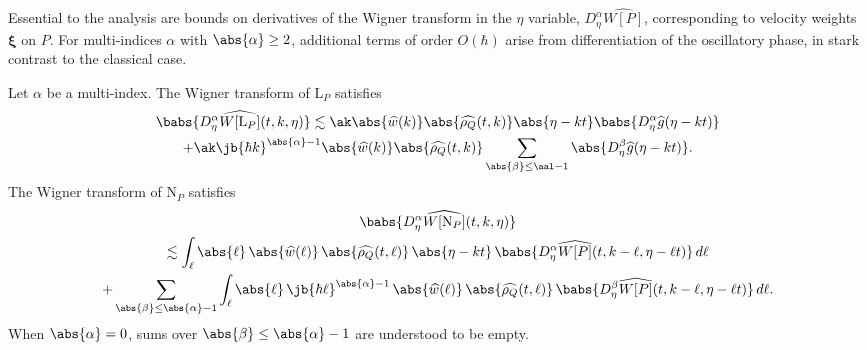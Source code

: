 Essential to the analysis are bounds on derivatives of the Wigner transform in the \( \eta \) variable, \( D^\alpha_\eta\widehat{W[P]} \), corresponding to velocity weights \( \bm{\xi} \) on \( P \). For multi-indices $\alpha$ with $\abs{\alpha}\geq2$, additional terms of order \( O(\hbar) \) arise from differentiation of the oscillatory phase, in stark contrast to the classical case.
\begin{lemma}\label{etalemma}
Let $\alpha$ be a multi-index. The Wigner transform of ${\mathrm{L}_P}$ satisfies\vspace*{-5pt}
\begin{multline*}
\babs{D^\alpha_\eta\widehat{W[{\mathrm{L}_P}]}(t,k,\eta)}\lesssim \ak\abs{\widehat w(k)}\abs{\widehat{\rho_Q}(t,k)}\abs{\eta-kt}\babs{D^\alpha_\eta\widehat g(\eta-kt)}\\
+\ak\jb{\hbar k}^{\abs{\alpha}-1}\abs{\widehat w(k)}\abs{\widehat{\rho_Q}(t,k)}\sum_{\abs{\beta}\leq \aal-1}\abs{D^\beta_\eta\widehat g(\eta-kt)}.
\end{multline*}
The Wigner transform of ${\mathrm{N}_P}$ satisfies\vspace*{-5pt}
\begin{multline*}
\babs{D^\alpha_\eta\widehat{W[{\mathrm{N}_P}]}(t,k,\eta)}\\
\lesssim\int_\ell \abs{\ell }\,\abs{\widehat w(\ell )}\,\abs{\widehat{\rho_Q}(t,\ell )}\,\abs{\eta-kt}\,\babs{D_\eta^\alpha \widehat{W[P]}(t,k-\ell ,\eta-\ell t)}\,d\ell\\
+\sum_{\abs{\beta}\leq \abs{\alpha}-1}\int_\ell\abs{\ell}\,\jb{\hbar \ell}^{\abs{\alpha}-1}\,\abs{\widehat w(\ell )}\,\abs{\widehat{\rho_Q}(t,\ell )}\,\babs{D_\eta^\beta \widehat{W[P]}(t,k-\ell ,\eta-\ell t)}\,d\ell.
\end{multline*}
When $\abs{\alpha}=0$, sums over $\abs{\beta}\leq\abs{\alpha}-1$ are understood to be empty.
\end{lemma}
